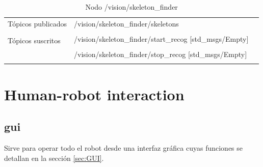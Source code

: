 \documentclass[a4paper,usenames,dvipsnames,svgnames,table]{book}
\begin{document}
\begin{table}[H]
\begin{center}
\begin{tabular}{|l|p{6cm}|p{5cm}|}%
\hline

Tópicos publicados
& /vision/skeleton\_finder/skeletons  &  \\
& & \\
\hline

\multirow{2}{*}{Tópicos suscritos}
& /vision/skeleton\_finder/start\_recog [std\_msgs/Empty] &  \\
& & \\
& /vision/skeleton\_finder/stop\_recog [std\_msgs/Empty] &  \\
& & \\
\cline{1-3}
 
\end{tabular}
\caption{Nodo /vision/skeleton\_finder}
\label{skeleton finder node}
\end{center}
\end{table}

\section{Human-robot interaction}

\subsection{gui}
Sirve para operar todo el robot desde una interfaz gráfica cuyas funciones se detallan en la sección \ref{sec:GUI}.
\end{document}
